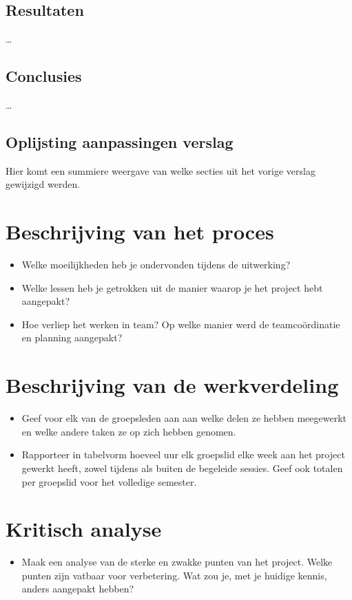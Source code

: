 \documentclass[tt1]{penoverslag}
\begin{document}
\subsection{Resultaten}
\ldots

\subsection{Conclusies}
\ldots

\subsection{Oplijsting aanpassingen verslag}
Hier komt een summiere weergave van welke secties uit het vorige verslag gewijzigd werden.





\section{Beschrijving van het proces}
\begin{itemize}
\item Welke moeilijkheden heb je ondervonden tijdens de uitwerking?
\item Welke lessen heb je getrokken uit de manier waarop je het project hebt aangepakt?
\item Hoe verliep het werken in team? Op welke manier werd de teamco\"ordinatie en planning aangepakt?
\end{itemize}


\section{Beschrijving van de werkverdeling}
\begin{itemize}
\item Geef voor elk van de groepsleden aan aan welke delen ze hebben meegewerkt en welke andere taken ze op zich hebben genomen.
\item Rapporteer in tabelvorm hoeveel uur elk groepslid elke week aan het project gewerkt heeft, zowel tijdens als buiten de begeleide sessies. Geef ook totalen per groepslid voor het volledige semester.
\end{itemize}


\section{Kritisch analyse}
\begin{itemize}
\item Maak een analyse van de sterke en zwakke punten van het project. Welke punten zijn vatbaar voor verbetering. Wat zou je, met je huidige kennis, anders aangepakt hebben?
\end{itemize}
\end{document}
